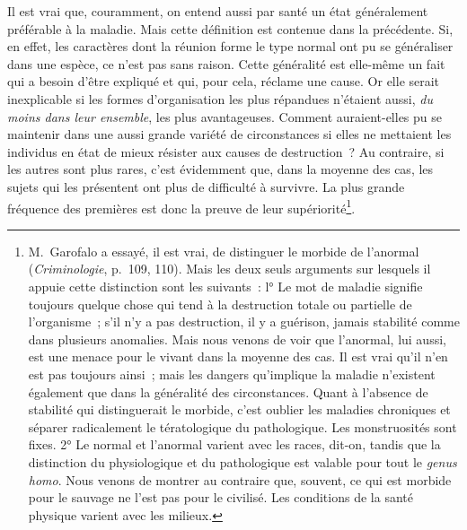 \documentclass[french,twoside]{book} %
\begin{document}
Il est vrai que, couramment, on entend aussi par santé un état généralement préférable à la maladie. Mais cette définition est contenue dans la précédente. Si, en effet, les caractères dont la réunion forme le type normal ont pu se généraliser dans une espèce, ce n’est pas sans raison. Cette généralité est elle-même un fait qui a besoin d’être expliqué et qui, pour cela, réclame une cause. Or elle serait inexplicable si les formes d’organisation les plus répandues n’étaient aussi, {\itshape du moins dans leur ensemble}, les plus avantageuses. Comment auraient-elles pu se maintenir dans une aussi grande variété de circonstances si elles ne mettaient les individus en état de mieux résister aux causes de destruction ? Au contraire, si les autres sont plus rares, c’est évidemment que, dans la moyenne des cas, les sujets qui les présentent ont plus de difficulté à survivre. La plus grande fréquence des premières est donc la preuve de leur supériorité\footnote{ M. Garofalo a essayé, il est vrai, de distinguer le morbide de l’anormal (\emph{Criminologie}, p. 109, 110). Mais les deux seuls arguments sur lesquels il appuie cette distinction sont les suivants : l° Le mot de maladie signifie toujours quelque chose qui tend à la destruction totale ou partielle de l’organisme ; s’il n’y a pas destruction, il y a guérison, jamais stabilité comme dans plusieurs anomalies. Mais nous venons de voir que l’anormal, lui aussi, est une menace pour le vivant dans la moyenne des cas. Il est vrai qu’il n’en est pas toujours ainsi ; mais les dangers qu’implique la maladie n’existent également que dans la généralité des circonstances. Quant à l’absence de stabilité qui distinguerait le morbide, c’est oublier les maladies chroniques et séparer radicalement le tératologique du pathologique. Les monstruosités sont fixes. 2° Le normal et l’anormal varient avec les races, dit-on, tandis que la distinction du physiologique et du pathologique est valable pour tout le {\itshape genus homo}. Nous venons de montrer au contraire que, souvent, ce qui est morbide pour le sauvage ne l’est pas pour le civilisé. Les conditions de la santé physique varient avec les milieux.}.
\end{document}
